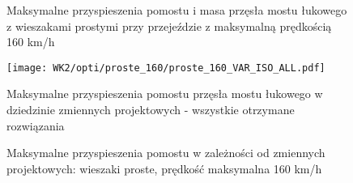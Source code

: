 \pagebreak[4]

\begin{figure}[hbt!]
	\centering
	\captionsetup{justification=centering}
	\caption{Maksymalne przyspieszenia pomostu i masa przęsła mostu łukowego z wieszakami prostymi przy przejeździe z maksymalną prędkością 160 km/h}
	\label{fig:wk2_opti_proste_160_variables}
\end{figure}

\begin{figure}[hbt!]
	\centering
	\texttt{[image: WK2/opti/proste\_160/proste\_160\_VAR\_ISO\_ALL.pdf]}
	\captionsetup{justification=centering}
	\caption{Maksymalne przyspieszenia pomostu przęsła mostu łukowego w dziedzinie zmiennych projektowych - wszystkie otrzymane rozwiązania}
	\label{fig:wk2_opti_proste_160_vars_all}
\end{figure}
\begin{figure}[hbt!]
	\centering
	\captionsetup{justification=centering}
	\caption{Maksymalne przyspieszenia pomostu w zależności od zmiennych projektowych: wieszaki proste, prędkość maksymalna 160 km/h}
	\label{fig:wk2_opti_proste_160_var_2d}
\end{figure}

